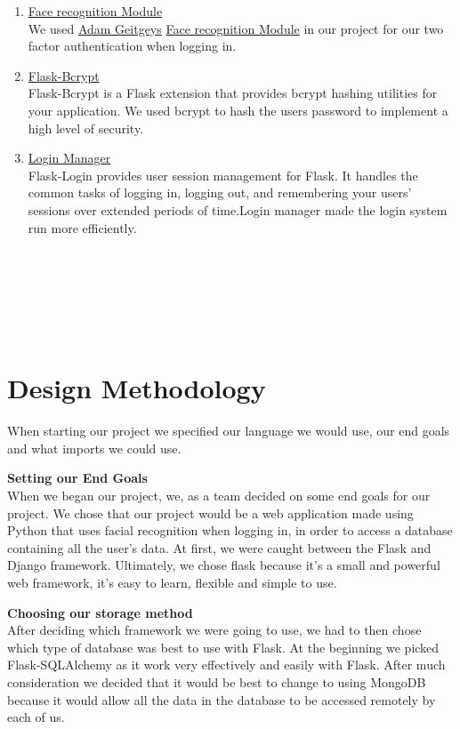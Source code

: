 \documentclass{article}
\begin{document}
\begin{enumerate}
\item \href{https://github.com/ageitgey/face_recognition}{Face recognition Module} \\
We used  \href{https://github.com/ageitgey}{Adam Geitgeys} \href{https://github.com/ageitgey/face_recognition}{Face recognition Module} in our project for our two factor authentication when logging in.

\item \href{https://flask-bcrypt.readthedocs.io/en/latest/}{Flask-Bcrypt} \\	
Flask-Bcrypt is a Flask extension that provides bcrypt hashing utilities for your application. We used bcrypt to hash the users password to implement a high level of security.

\item \href{https://flask-login.readthedocs.io/en/latest/}{Login Manager} \\	
Flask-Login provides user session management for Flask. It handles the common tasks of logging in, logging out, and remembering your users’ sessions over extended periods of time.Login manager made the login system run more efficiently.

\\
\\
\\
\\
\\
\end{enumerate}

\newpage

\section{Design Methodology}
When starting our project we specified our language we would use, our end goals  and what imports we could use.\medskip

\textbf{Setting our End Goals} \\
When we began our project, we, as a team decided on some end goals for our project.  We chose that our project would be a web application made using Python that uses facial recognition when logging in, in order to access a database containing all the user’s data.
At first, we were caught between the Flask and Django framework. Ultimately, we chose flask because it’s a small and powerful web framework, it’s easy to learn, flexible and simple to use.\medskip

\textbf{Choosing our storage method} \\
After deciding which framework we were going to use, we had to then chose which type of database was best to use with Flask. At the beginning we picked Flask-SQLAlchemy as it work very effectively and easily with Flask. After much consideration we decided that it would be best to change to using MongoDB because it would allow all the data in the database to be accessed remotely by each of us.\medskip
\end{document}
